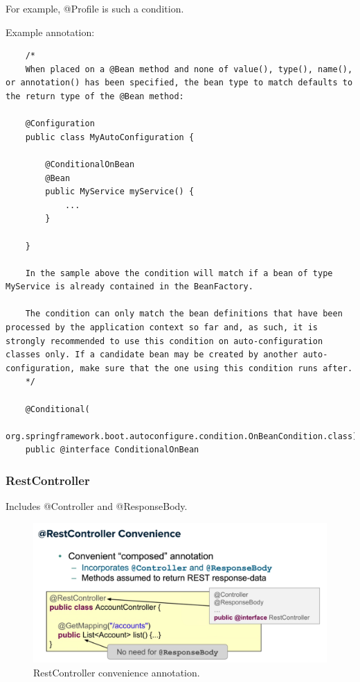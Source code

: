 \documentclass{scrartcl}
\begin{document}
For example, @Profile is such a condition.

Example annotation:

\begin{lstlisting}
    /*
    When placed on a @Bean method and none of value(), type(), name(), or annotation() has been specified, the bean type to match defaults to the return type of the @Bean method:

    @Configuration
    public class MyAutoConfiguration {

        @ConditionalOnBean
        @Bean
        public MyService myService() {
            ...
        }

    }

    In the sample above the condition will match if a bean of type MyService is already contained in the BeanFactory.

    The condition can only match the bean definitions that have been processed by the application context so far and, as such, it is strongly recommended to use this condition on auto-configuration classes only. If a candidate bean may be created by another auto-configuration, make sure that the one using this condition runs after.
    */

    @Conditional(
        org.springframework.boot.autoconfigure.condition.OnBeanCondition.class)
    public @interface ConditionalOnBean

\end{lstlisting}

\subsubsection{RestController}

Includes @Controller and @ResponseBody.

\begin{figure}
    \centering
    \includegraphics[width=1\linewidth]{restcontroller}
    \caption{RestController convenience annotation.}
    \label{fig:restcontroller}
\end{figure}
\end{document}
